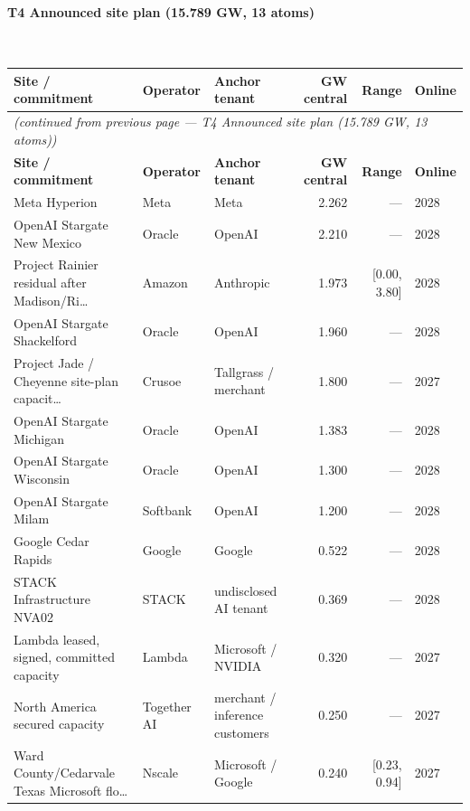 \paragraph{\textbf{T4 Announced site plan (15.789 GW, 13 atoms)}}~\\[0.3em]
\noindent\begin{small}
\begin{longtable}{@{}p{4.5cm} p{2.4cm} p{2.4cm} r r p{1.8cm}@{}}
\toprule
\textbf{Site / commitment} & \textbf{Operator} & \textbf{Anchor tenant} & \textbf{GW central} & \textbf{Range} & \textbf{Online} \\
\midrule
\endfirsthead
\multicolumn{6}{l}{\textit{(continued from previous page — T4 Announced site plan (15.789 GW, 13 atoms))}} \\
\toprule
\textbf{Site / commitment} & \textbf{Operator} & \textbf{Anchor tenant} & \textbf{GW central} & \textbf{Range} & \textbf{Online} \\
\midrule
\endhead
\bottomrule
\endfoot

Meta Hyperion & Meta & Meta & 2.262 & — & 2028 \\

OpenAI Stargate New Mexico & Oracle & OpenAI & 2.210 & — & 2028 \\

Project Rainier residual after Madison/Ri… & Amazon & Anthropic & 1.973 & [0.00, 3.80] & 2028 \\

OpenAI Stargate Shackelford & Oracle & OpenAI & 1.960 & — & 2028 \\

Project Jade / Cheyenne site-plan capacit… & Crusoe & Tallgrass / merchant & 1.800 & — & 2027 \\

OpenAI Stargate Michigan & Oracle & OpenAI & 1.383 & — & 2028 \\

OpenAI Stargate Wisconsin & Oracle & OpenAI & 1.300 & — & 2028 \\

OpenAI Stargate Milam & Softbank & OpenAI & 1.200 & — & 2028 \\

Google Cedar Rapids & Google & Google & 0.522 & — & 2028 \\

STACK Infrastructure NVA02 & STACK & undisclosed AI tenant & 0.369 & — & 2028 \\

Lambda leased, signed, committed capacity & Lambda & Microsoft / NVIDIA & 0.320 & — & 2027 \\

North America secured capacity & Together AI & merchant / inference customers & 0.250 & — & 2027 \\

Ward County/Cedarvale Texas Microsoft flo… & Nscale & Microsoft / Google & 0.240 & [0.23, 0.94] & 2027 \\

\end{longtable}\end{small}


